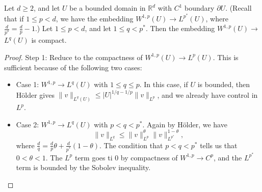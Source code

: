 \begin{theorem}
\label{thm: Rellich-Kondrachov}
Let $d \geq 2$, and let $U$ be a bounded domain in $\mathbb{R}^{d}$ with $C^{1}$ boundary $\partial U$. (Recall that if $1 \leq p<d$, we have the embedding $W^{1, p}(U) \rightarrow L^{p^{*}}(U)$, where $\frac{d}{p^{*}}=\frac{d}{p}-1$.) Let $1 \leq p<d$, and let $1 \leq q<p^{*}$. Then the embedding $W^{1, p}(U) \rightarrow$ $L^{q}(U)$ is compact.
\end{theorem}
\begin{proof}

Step 1: Reduce to the compactness of $W^{1, p}(U) \rightarrow L^{p}(U)$. This is sufficient because of the following two cases:
\begin{itemize}
    \item Case 1: $W^{1, p} \rightarrow L^{q}(U)$ with $1 \leq q \leq p$. In this case, if $U$ is bounded, then Hölder gives $\|v\|_{L^{q}(U)} \leq|U|^{1 / q-1 / p}\|v\|_{L^{p}}$, and we already have control in $L^{p}$.
    \item Case 2: $W^{1, p} \rightarrow L^{q}(U)$ with $p<q<p^{*}$. Again by Hölder, we have
    $$
    \|v\|_{L^{q}} \leq\|v\|_{L^{p}}^{\theta}\|v\|_{L^{p^{*}}}^{1-\theta},
    $$
    where $\frac{d}{q}=\frac{d}{p} \theta+\frac{d}{p^{*}}(1-\theta)$. The condition that $p<q<p^{*}$ tells us that $0<\theta<1$. The $L^{p}$ term goes ti 0 by compactness of $W^{1, p} \rightarrow C^{p}$, and the $L^{p^{*}}$ term is bounded by the Sobolev inequality.
\end{itemize}


\end{proof}
